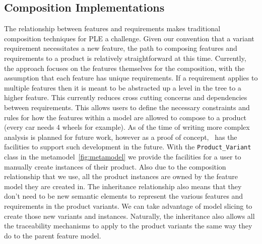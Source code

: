 \subsection{Composition Implementations}

The relationship between features and requirements makes traditional composition techniques for \ac{PLE} a challenge. Given our convention that a variant requirement necessitates a new feature, the path to composing features and requirements to a product is relatively straightforward at this time. Currently, the approach focuses on the features themselves for the composition, with the assumption that each feature has unique requirements. If a requirement applies to multiple features then it is meant to be abstracted up a level in the tree to a higher feature. This currently reduces cross cutting concerns and dependencies between requirements. This allows users to define the necessary constraints and rules for how the features within a model are allowed to compose to a product (every car needs 4 wheels for example). As of the time of writing more complex analysis is planned for future work, however as a proof of concept, \tool\ has the facilities to support such development in the future. With the \texttt{Product\_Variant} class in the metamodel~\ref{fig:metamodel} we provide the facilities for a user to manually create instances of their product. Also due to the composition relationship that we use, all the product instances are owned by the feature model they are created in. The inheritance relationship also means that they don't need to be new semantic elements to represent the various features and requirements in the product variants. We can take advantage of model slicing to create those new variants and instances. Naturally, the inheritance also allows all the traceability mechanisms to apply to the product variants the same way they do to the parent feature model.
